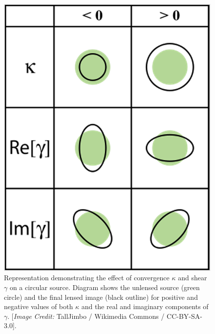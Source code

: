 \begin{figure}
\begin{center}
\includegraphics[scale=0.3]{plots_intro/kappa_gamma.png}
\caption[$\kappa$ and $\gamma$ Diagram]{Representation demonstrating the effect of convergence $\kappa$ and shear $\gamma$ on a circular source. Diagram shows the unlensed source (green circle) and the final lensed image (black outline) for positive and negative values of both $\kappa$ and the real and imaginary components of $\gamma$. [{\it Image Credit:} TallJimbo / Wikimedia Commons / CC-BY-SA-3.0].}
\label{plot:kappagamma}
\end{center}
\end{figure}


